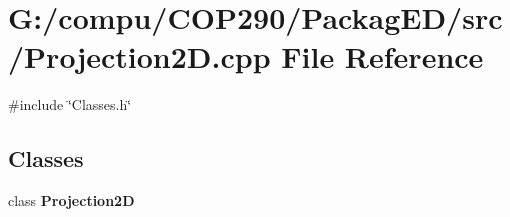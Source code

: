 \section{G\+:/compu/\+C\+O\+P290/\+Packag\+E\+D/src/\+Projection2D.cpp File Reference}
\label{_projection2_d_8cpp}
{\ttfamily \#include \char`\"{}Classes.\+h\char`\"{}}\newline
\subsection*{Classes}
\begin{DoxyCompactItemize}
\item 
class \textbf{ Projection2D}
\end{DoxyCompactItemize}
